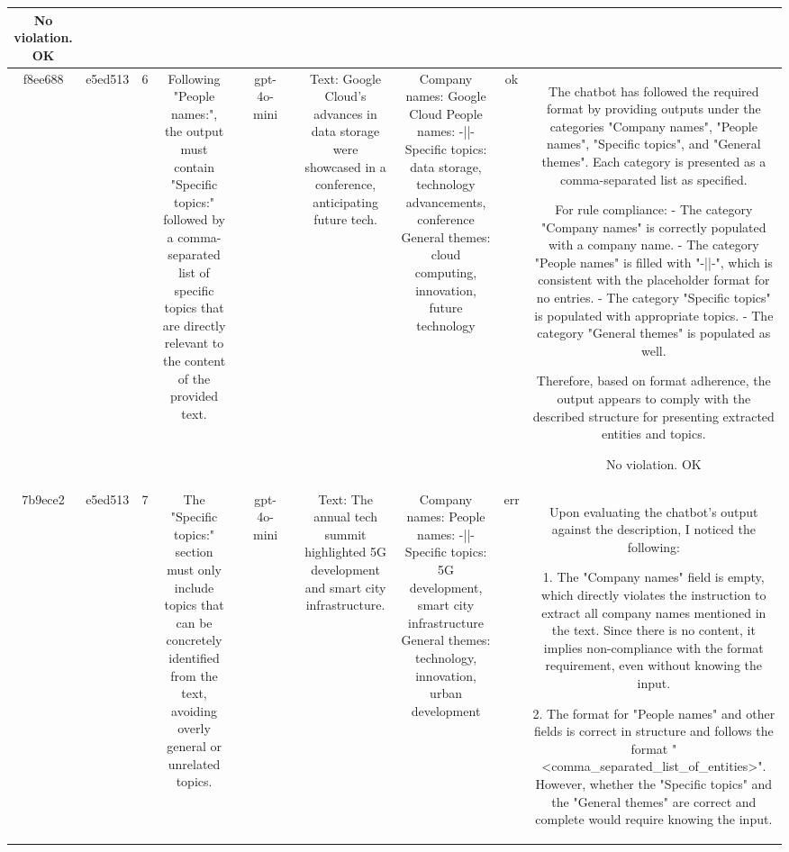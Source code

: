 \begin{table}[h!]
\begin{tabular}{|c|c|c|c|c|c|c|c|c|c|c|}
No violation.
OK\\
\hline
f8ee688 & e5ed513 & 6 & Following "People names:", the output must contain "Specific topics:" followed by a comma-separated list of specific topics that are directly relevant to the content of the provided text. &  & gpt-4o-mini &  & Text: Google Cloud's advances in data storage were showcased in a conference, anticipating future tech. & Company names: Google Cloud
People names: -||-
Specific topics: data storage, technology advancements, conference
General themes: cloud computing, innovation, future technology & ok & The chatbot has followed the required format by providing outputs under the categories "Company names", "People names", "Specific topics", and "General themes". Each category is presented as a comma-separated list as specified. 

For rule compliance: 
- The category "Company names" is correctly populated with a company name.
- The category "People names" is filled with "-||-", which is consistent with the placeholder format for no entries.
- The category "Specific topics" is populated with appropriate topics.
- The category "General themes" is populated as well.

Therefore, based on format adherence, the output appears to comply with the described structure for presenting extracted entities and topics.

No violation.
OK\\
\hline
7b9ece2 & e5ed513 & 7 & The "Specific topics:" section must only include topics that can be concretely identified from the text, avoiding overly general or unrelated topics. &  & gpt-4o-mini &  & Text: The annual tech summit highlighted 5G development and smart city infrastructure. & Company names: 
People names: -||-
Specific topics: 5G development, smart city infrastructure
General themes: technology, innovation, urban development & err & Upon evaluating the chatbot's output against the description, I noticed the following:

1. The "Company names" field is empty, which directly violates the instruction to extract all company names mentioned in the text. Since there is no content, it implies non-compliance with the format requirement, even without knowing the input.

2. The format for "People names" and other fields is correct in structure and follows the format "<comma_separated_list_of_entities>". However, whether the "Specific topics" and the "General themes" are correct and complete would require knowing the input.


\end{tabular}
\end{table}
